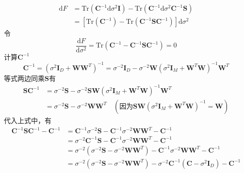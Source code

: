 \begin{enumerate}
	\begin{equation}
		\begin{aligned}
			\mathrm{d}F&=\mathrm{Tr}(\boldsymbol{C}^{-1}\mathrm{d}\sigma^2\boldsymbol{I})-\mathrm{Tr}(\boldsymbol{C}^{-1}\mathrm{d}\sigma^2\boldsymbol{C}^{-1}\boldsymbol{S})\\
			&=[\mathrm{Tr}(\boldsymbol{C}^{-1})-\mathrm{Tr}(\boldsymbol{C}^{-1}\boldsymbol{S}\boldsymbol{C}^{-1})]\mathrm{d}\sigma^2
		\end{aligned}
	\end{equation}
	令
	\begin{equation}
		\frac{\mathrm{d}F}{\mathrm{d}\sigma^2}=\mathrm{Tr}(\boldsymbol{C}^{-1}-\boldsymbol{C}^{-1}\boldsymbol{S}\boldsymbol{C}^{-1})=0
	\end{equation}
	计算$\boldsymbol{C}^{-1}$
	\begin{equation}
		\boldsymbol{C}^{-1}=(\sigma^2\boldsymbol{I}_D+\boldsymbol{WW}^T)^{-1}=\sigma^{-2}\boldsymbol{I}_D-\sigma^{-2}\boldsymbol{W}(\sigma^2\boldsymbol{I}_M+\boldsymbol{W}^T\boldsymbol{W})^{-1}\boldsymbol{W}^T
	\end{equation}
	等式两边同乘$\boldsymbol{S}$有
	\begin{equation}
		\begin{aligned}
			\boldsymbol{S}\boldsymbol{C}^{-1}&=\sigma^{-2}\boldsymbol{S}-\sigma^{-2}\boldsymbol{S}\boldsymbol{W}(\sigma^2\boldsymbol{I}_M+\boldsymbol{W}^T\boldsymbol{W})^{-1}\boldsymbol{W}^T\\
			&=\sigma^{-2}\boldsymbol{S}-\sigma^{-2}\boldsymbol{WW}^T\quad (\text{因为}\boldsymbol{S}\boldsymbol{W}(\sigma^2\boldsymbol{I}_M+\boldsymbol{W}^T\boldsymbol{W})^{-1}=\boldsymbol{W})
		\end{aligned}
	\end{equation}
	代入上式中，有
	\begin{equation}
	\begin{aligned}
		\boldsymbol{C}^{-1}\boldsymbol{S}\boldsymbol{C}^{-1}-\boldsymbol{C}^{-1}&=\boldsymbol{C}^{-1}\sigma^{-2}\boldsymbol{S}-\boldsymbol{C}^{-1}\sigma^{-2}\boldsymbol{WW}^T-\boldsymbol{C}^{-1}\\
		&=\sigma^{-2}\boldsymbol{C}^{-1}\boldsymbol{S}-\boldsymbol{C}^{-1}\sigma^{-2}\boldsymbol{WW}^T-\boldsymbol{C}^{-1}\\
		&=\sigma^{-2}(\sigma^{-2}\boldsymbol{S}-\sigma^{-2}\boldsymbol{WW}^T)-\boldsymbol{C}^{-1}\sigma^{-2}\boldsymbol{WW}^T-\boldsymbol{C}^{-1}\\
		&=\sigma^{-2}(\sigma^{-2}\boldsymbol{S}-\sigma^{-2}\boldsymbol{WW}^T)-\sigma^{-2}\boldsymbol{C}^{-1}(\boldsymbol{C}-\sigma^2\boldsymbol{I}_D)-\boldsymbol{C}^{-1}\\

\end{aligned}
\end{equation}
\end{enumerate}
